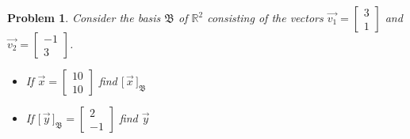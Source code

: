\documentclass{article}
\newtheorem{problem}{Problem}
\newcommand{\Coord}[2]{\Bigg[ \, \vec{#1} \, \Bigg]_{\mathfrak{#2}}}
\begin{document}
\begin{problem}
Consider the basis $\mathfrak{B}$ of $\mathbb{R}^2$ consisting of the vectors $\vec{v_{1}} = \begin{bmatrix}3 \\ 1 \end{bmatrix}$ and $\vec{v_{2}} = \begin{bmatrix}-1 \\ 3 \end{bmatrix}$. 

\begin{itemize}
\item If $\vec{x} = \begin{bmatrix} 10 \\ 10 \end{bmatrix}$ find $\Coord{x}{B}$
\item If $\Coord{y}{B} = \begin{bmatrix} 2 \\ -1 \end{bmatrix}$ find $\vec{y}$
\end{itemize}
\end{problem}
\end{document}
